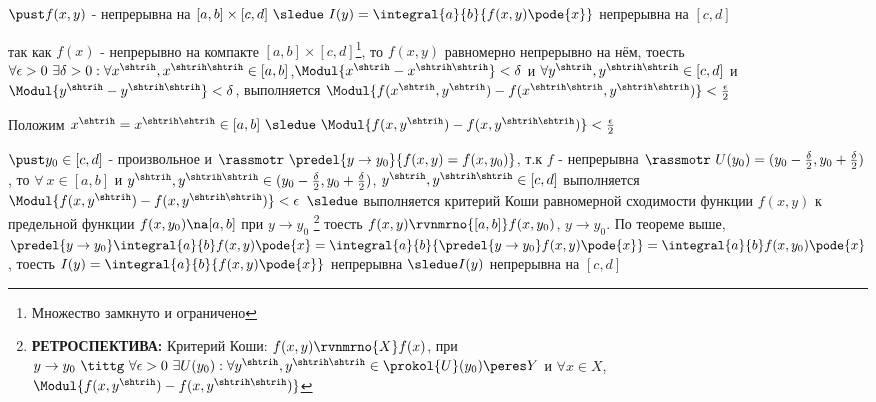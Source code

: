 \begin{proofs}
	$\pust f(x,y)$ - непрерывна на $[a,b] \times [c,d] \ \sledue \ I(y) = \integral{a}{b}{f(x,y)\pode{x}}$ непрерывна на $[c,d]$

	\begin{dokvo}
		так как $f(x)$ - непрерывно на компакте $[a,b] \times [c,d]$\footnote{Множество замкнуто и ограничено}, то $f(x,y)$ равномерно непрерывно на нём, тоесть $\forall \epsilon > 0 \ \exists \delta > 0: \forall x^{\shtrih},x^{\shtrih\shtrih}\in [a,b]$,$ \Modul{x^{\shtrih} - x^{\shtrih\shtrih}} < \delta$
		и $\forall y^{\shtrih},y^{\shtrih\shtrih}\in [c,d] $ и $\Modul{y^{\shtrih} - y^{\shtrih\shtrih}} < \delta$,
		выполняется $\Modul{f(x^{\shtrih},y^{\shtrih}) - f(x^{\shtrih\shtrih}, y^{\shtrih\shtrih})} < \frac{\epsilon}{2}$

		Положим $x^{\shtrih} = x^{\shtrih\shtrih} \in [a,b] \ \sledue \ \Modul{f(x, y^{\shtrih}) - f(x, y^{\shtrih\shtrih})} < \frac{\epsilon}{2}$

		$\pust y_0 \in [c,d]$ - произвольное и $\rassmotr \ \predel{y \to y_0}{f(x,y) = f(x,y_0)}$, т.к $f$ - непрерывна $\rassmotr \ U(y_0) = (y_0 - \frac{\delta}{2}, y_0 + \frac{\delta}{2})$,
		то $\forall \ x \in [a,b]$ и $y^{\shtrih}, y^{\shtrih\shtrih} \in (y_0 - \frac{\delta}{2}, y_0 + \frac{\delta}{2})$,
		$y^{\shtrih}, y^{\shtrih\shtrih} \in [c,d]$ выполняется $\Modul{f(x,y^{\shtrih}) - f(x,y^{\shtrih\shtrih})} < \epsilon$
		$\sledue$ выполняется критерий Коши равномерной сходимости функции $f(x,y)$ к предельной функции $f(x,y_0) \na [a,b]$ при
		$y \to y_0$ \footnote{\textbf{РЕТРОСПЕКТИВА:} Критерий Коши: $f(x,y) \rvnmrno{X} f(x)$, при $y\to y_0 \ \tittg \ \forall \epsilon > 0 \ \exists U(y_0): \forall y^{\shtrih}, y^{\shtrih\shtrih} \in \prokol{U}(y_0)\peres Y$ и $\forall x \in X$, $\Modul{f(x,y^{\shtrih}) - f(x,y^{\shtrih\shtrih})}$}
		тоесть $f(x,y) \rvnmrno{[a,b]} f(x, y_0)$, $y \to y_0$.
		По теореме выше, $\predel{y \to y_0}\integral{a}{b}f(x,y)\pode{x} = \integral{a}{b}{\predel{y \to y_0}f(x,y)\pode{x}} = \integral{a}{b}f(x,y_0)\pode{x}$, тоесть $I(y) = \integral{a}{b}{f(x,y)\pode{x}}$ непрерывна  $\sledue I(y)$ непрерывна на $[c,d]$
	\end{dokvo}
\end{proofs}

